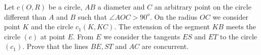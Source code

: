 Let $c(O, R)$ be a circle, $AB$ a diameter and $C$ an arbitrary point on the circle different than $A$ and $B$ such that $\angle AOC > 90^o$. On the radius $OC$ we consider point $K$ and the circle $c_1(K, KC)$. The extension of the segment $KB$ meets the circle $(c)$ at point $E$. From $E$ we consider the tangents $ES$ and $ET$ to the circle $(c_1)$. Prove that the lines $BE, ST$ and $AC$ are concurrent.